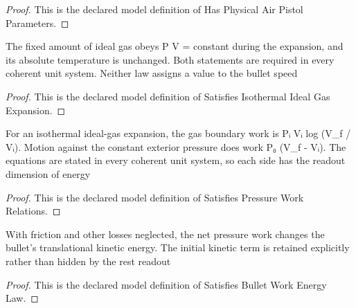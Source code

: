 \begin{proof}
  This is the declared model definition of Has Physical Air Pistol Parameters.
\end{proof}
\begin{definition}
  \label{def:physics:phyx-mini-0461:phyxminiproblems-problemphyxmini0461-satisfiesisothermalidealgasexpansion}
  The fixed amount of ideal gas obeys P V = constant during the expansion, and its absolute temperature is unchanged. Both statements are required in every coherent unit system. Neither law assigns a value to the bullet speed
\end{definition}
\begin{proof}
  This is the declared model definition of Satisfies Isothermal Ideal Gas Expansion.
\end{proof}
\begin{definition}
  \label{def:physics:phyx-mini-0461:phyxminiproblems-problemphyxmini0461-satisfiespressureworkrelations}
  For an isothermal ideal-gas expansion, the gas boundary work is Pᵢ Vᵢ log (V\_f / Vᵢ). Motion against the constant exterior pressure does work P₀ (V\_f - Vᵢ). The equations are stated in every coherent unit system, so each side has the readout dimension of energy
\end{definition}
\begin{proof}
  This is the declared model definition of Satisfies Pressure Work Relations.
\end{proof}
\begin{definition}
  \label{def:physics:phyx-mini-0461:phyxminiproblems-problemphyxmini0461-satisfiesbulletworkenergylaw}
  With friction and other losses neglected, the net pressure work changes the bullet's translational kinetic energy. The initial kinetic term is retained explicitly rather than hidden by the rest readout
\end{definition}
\begin{proof}
  This is the declared model definition of Satisfies Bullet Work Energy Law.
\end{proof}
